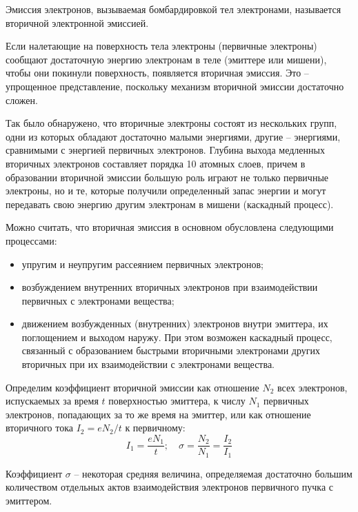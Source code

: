 
Эмиссия электронов, вызываемая бомбардировкой тел электронами, называется 
вторичной электронной эмиссией.

Если налетающие на поверхность тела электроны (первичные электроны) сообщают 
достаточную энергию электронам в теле (эмиттере или мишени), чтобы они покинули 
поверхность, появляется вторичная эмиссия. Это -- упрощенное представление, 
поскольку механизм вторичной эмиссии достаточно сложен.

Так было обнаружено, что вторичные электроны состоят из нескольких групп, одни 
из которых обладают достаточно малыми энергиями, другие -- энергиями, 
сравнимыми с энергией первичных электронов. Глубина выхода медленных 
вторичных электронов составляет порядка 10 атомных слоев, причем в образовании 
вторичной эмиссии большую роль играют не только первичные электроны, но и те, 
которые получили определенный запас энергии и могут передавать свою энергию 
другим электронам в мишени (каскадный процесс).

Можно считать, что вторичная эмиссия в основном обусловлена следующими 
процессами:
\begin{itemize}
    \item упругим и неупругим рассеянием первичных электронов;
    \item возбуждением внутренних вторичных электронов при взаимодействии 
        первичных с электронами вещества;
    \item движением возбужденных (внутренних) электронов внутри эмиттера, их 
        поглощением и выходом наружу. При этом возможен каскадный процесс, 
        связанный с образованием быстрыми вторичными электронами других 
        вторичных при их взаимодействии с электронами вещества.
\end{itemize}

Определим коэффициент вторичной эмиссии как отношение \( N_2 \) всех 
электронов, испускаемых за время \( t \) поверхностью эмиттера, к числу \( N_1 \) 
первичных электронов, попадающих за то же время на эмиттер, или как отношение 
вторичного тока \( I_2 = eN_2 / t \) к первичному:
\begin{equation}
    I_1 = \frac{eN_1}{t};\quad
    \sigma = \frac{N_2}{N_1} = \frac{I_2}{I_1}
    \label{eq05.1.18}
\end{equation}
 
Коэффициент \( \sigma \) -- некоторая средняя величина, определяемая достаточно 
большим количеством отдельных актов взаимодействия электронов первичного пучка 
с эмиттером.

